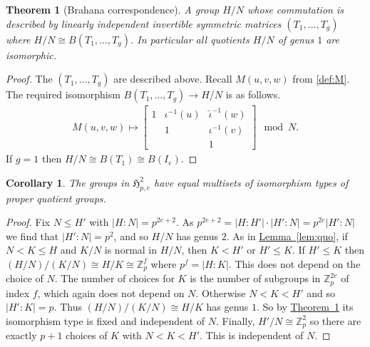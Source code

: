 \documentclass[11pt]{article}
\numberwithin{equation}{section}
\theoremstyle{definition}
\theoremstyle{plain}
\newcommand{\expref}[2]{\hyperref[#2]{#1~\ref{#2}}}
\numberwithin{equation}{section}
\theoremstyle{plain}       %
\newtheorem{thm}[equation]{Theorem}
\newtheorem{coro}[equation]{Corollary}
\theoremstyle{remark}
\theoremstyle{definition}
\numberwithin{figure}{section}
\numberwithin{table}{section}
\newcommand{\mygroups}{\mathfrak{H}}
\begin{document}
\begin{thm}[Brahana correspondence]\label{thm:Brahana}
	A group $H/N$ whose commutation is described by linearly independent
	invertible symmetric matrices $(T_1,\dots,T_g)$ where $H/N\cong
	B(T_1,\dots,T_g)$. In particular all quotients $H/N$ of genus $1$ are
	isomorphic.
\end{thm}
\begin{proof}
	The $(T_1,\ldots,T_g)$ are described above.  Recall $M(u,v,w)$ from
	\eqref{def:M}. The required isomorphism $B(T_1,\dots,T_g)\to H/N$ is as
	follows.
\begin{align*}
		M(u,v,w)
	\mapsto
	\begin{bmatrix}
		1 & \iota^{-1}(u) & \hat{\iota}^{-1}(w) \\ & 1 & \iota^{-1}(v)\\ & & 1
	\end{bmatrix}
	\mod{N}.		
\end{align*}
If $g=1$ then $H/N\cong B(T_1)\cong B(I_e)$.  
\end{proof}

\begin{coro}\label{coro:quo-profile}
	The groups in $\mygroups_{p,e}^{2}$ have equal multisets of isomorphism
	types of proper quotient groups.
\end{coro}
\begin{proof}
Fix $N\leq H'$ with $|H:N|=p^{2e+2}$.  As $p^{2e+2}=|H:H'|\cdot
|H':N|=p^{2e}|H':N|$ we find that $|H':N|=p^2$, and so $H/N$ has genus $2$.  As
in \expref{Lemma}{lem:quo}, if $N< K\leq H$ and $K/N$ is normal in $H/N$, then
$K<H'$ or $H'\leq K$.  If $H'\leq K$ then $(H/N)/(K/N)\cong H/K\cong
\mathbb{Z}_p^f$ where $p^f=|H:K|$.  This does not depend on the choice of $N$.
The number of choices for $K$ is the number of subgroups in $\mathbb{Z}_p^{2e}$
of index $f$, which again does not depend on $N$.  Otherwise $N<K<H'$ and so
$|H':K|=p$.  Thus $(H/N)/(K/N)\cong H/K$ has genus $1$.  So by
\expref{Theorem}{thm:Brahana} its isomorphism type is  fixed and independent of $N$.
Finally, $H'/N\cong \mathbb{Z}_p^2$ so there are exactly $p+1$ choices of $K$
with $N<K<H'$.  This is independent of $N$.
\end{proof}
\end{document}
